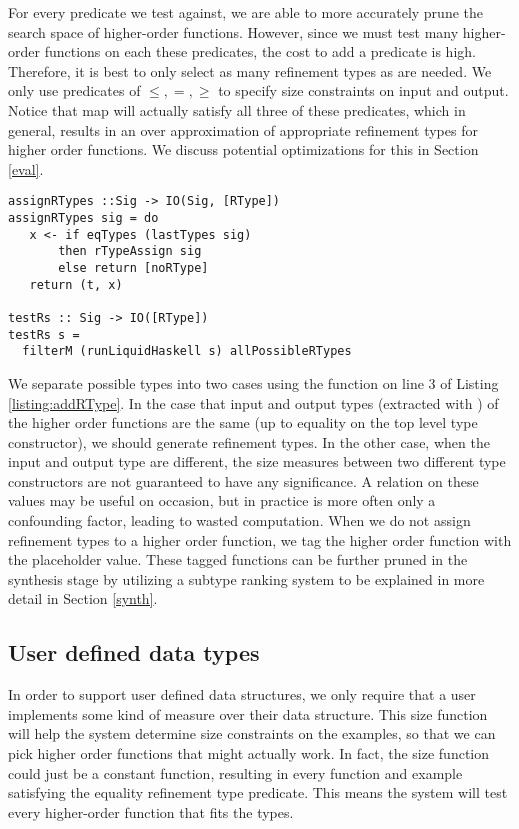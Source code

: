 
For every predicate we test against, we are able to more accurately prune the search space of higher-order functions.
However, since we must test many higher-order functions on each these predicates, the cost to add a predicate is high.
Therefore, it is best to only select as many refinement types as are needed.
We only use predicates of $\leq,=,\geq$ to specify size constraints on input and output.
Notice that map will actually satisfy all three of these predicates, which in general, results in an over approximation of appropriate refinement types for higher order functions.
We discuss potential optimizations for this in Section \ref{eval}.

\begin{lstlisting}[caption=Adding refinement types to higher order functions,label=listing:addRType]
assignRTypes ::Sig -> IO(Sig, [RType])
assignRTypes sig = do
   x <- if eqTypes (lastTypes sig) 
       then rTypeAssign sig
       else return [noRType]
   return (t, x)

testRs :: Sig -> IO([RType])
testRs s =
  filterM (runLiquidHaskell s) allPossibleRTypes
\end{lstlisting}

We separate possible types into two cases using the  function on line 3 of Listing \ref{listing:addRType}.
In the case that input and output types (extracted with ) of the higher order functions are the same (up to equality on the top level type constructor), we should generate refinement types.
In the other case, when the input and output type are different, the size measures between two different type constructors are not guaranteed to have any significance.
A relation on these values may be useful on occasion, but in practice is more often only a confounding factor, leading to wasted computation.
When we do not assign refinement types to a higher order function, we tag the higher order function with the placeholder  value.
These  tagged functions can be further pruned in the synthesis stage by utilizing a subtype ranking system to be explained in more detail in Section \ref{synth}.

\subsection{User defined data types}
In order to support user defined data structures, we only require that a user implements some kind of measure\cite{realWorldLiquid} over their data structure.
This size function will help the system determine size constraints on the examples, so that we can pick higher order functions that might actually work.
In fact, the size function could just be a constant function, resulting in every function and example satisfying the equality refinement type predicate. This means the system will test every higher-order function that fits the types.

